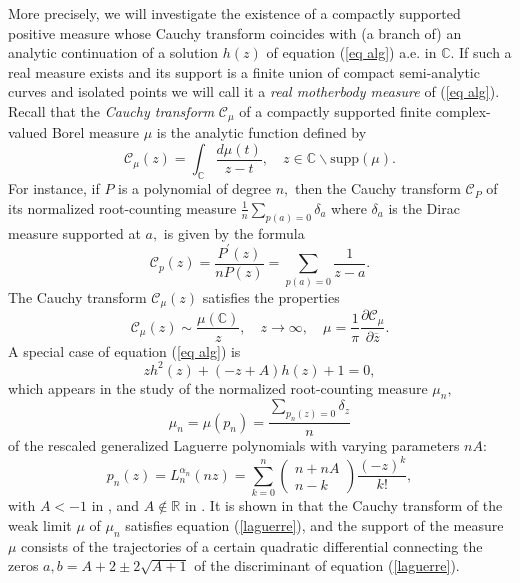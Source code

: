 \documentclass[12pt]{amsart}
\begin{document}
More precisely, we will investigate the existence of a compactly supported
positive measure whose Cauchy transform coincides with (a branch of) an
analytic continuation of a solution $h\left( z\right) $ of equation (\ref{eq
alg}) a.e. in $\mathbb{C}
.$ If such a real measure exists and its support is a finite union of
compact semi-analytic curves and isolated points we will call it a \emph{real motherbody measure} of (\ref{eq alg}). Recall that the \emph{Cauchy
transform} $\mathcal{C}_{\mu }$ of a compactly supported finite
complex-valued Borel measure $\mu $ is the analytic function defined by 
\begin{equation*}
\mathcal{C}_{\mu }\left( z\right) =\int_{\mathbb{C}
}\frac{d\mu \left( t\right) }{z-t},\quad z\in 
\mathbb{C}
\backslash \text{supp}\left( \mu \right) .
\end{equation*}For instance, if $P$ is a polynomial of degree $n,$ then the Cauchy
transform $\mathcal{C}_{P}$ of its normalized root-counting measure $\displaystyle\frac{1}{n}\sum_{p\left( a\right) =0}\delta _{a}$ where $\delta
_{a}$ is the Dirac measure supported at $a,$ is given by the formula 
\begin{equation*}
\mathcal{C}_{p}\left( z\right) =\frac{P^{\prime }\left( z\right) }{nP\left(
z\right) }=\sum_{p\left( a\right) =0}\frac{1}{z-a}.
\end{equation*}The Cauchy transform $\mathcal{C}_{\mu }\left( z\right) $ satisfies the
properties 
\begin{equation*}
\mathcal{C}_{\mu }\left( z\right) \sim \frac{\mu \left( 
\mathbb{C}
\right) }{z},\quad z\longrightarrow \infty ,\quad \mu =\frac{1}{\pi }\frac{\partial \mathcal{C}_{\mu }}{\partial \overline{z}}.
\end{equation*}\noindent A special case of equation (\ref{eq alg}) is 
\begin{equation}
zh^{2}\left( z\right) +\left( -z+A\right) h\left( z\right) +1=0,
\label{laguerre}
\end{equation}which appears in the study of the normalized root-counting measure $\mu
_{n}, $ 
\begin{equation*}
\mu _{n}=\mu \left( p_{n}\right) =\displaystyle\frac{\displaystyle\sum_{p_{n}\left( z\right) =0}\delta _{z}}{n}
\end{equation*}of the rescaled generalized Laguerre polynomials with varying parameters $nA$: 
\begin{equation*}
p_{n}\left( z\right) =L_{n}^{\alpha _{n}}\left( nz\right)
=\sum_{k=0}^{n}\left( 
\begin{array}{c}
n+nA \\ 
n-k\end{array}\right) \frac{\left( -z\right) ^{k}}{k!},
\end{equation*}with $A<-1$ in \cite{Kuijlaars}, and $A\notin 
\mathbb{R}
$ in \cite{paper1}. It is shown in \cite{weak} that the Cauchy transform of
the weak limit $\mu $ of $\mu _{n}$ satisfies equation (\ref{laguerre}), and
the support of the measure $\mu $ consists of the trajectories of a certain
quadratic differential connecting the zeros $a,b=A+2\pm 2\sqrt{A+1}$ of the
discriminant of equation (\ref{laguerre}).
\end{document}
